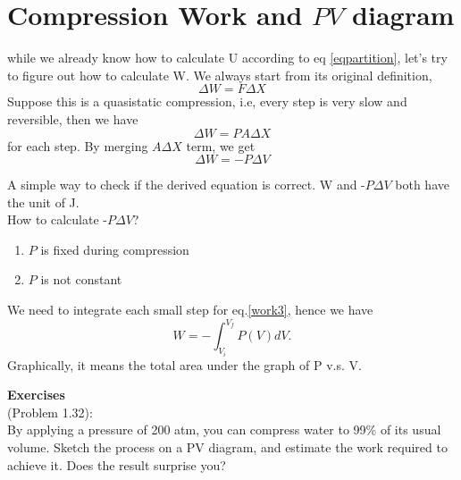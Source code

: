 \section{Compression Work and $PV$ diagram}
while we already know how to calculate U according to eq \ref{eqpartition}, let's try to figure out how to calculate W.
We always start from its original definition,
\begin{equation} \label{work1} \Delta W = F \Delta{X} \end{equation}
Suppose this is a quasistatic compression, i.e, every step is very slow and reversible, then we have
\begin{equation} \label{work2} \Delta W = P A \Delta{X} \end{equation}
for each step. By merging $A\Delta{X}$ term, we get
\begin{equation} \label{work3} \Delta W = - P \Delta{V} \end{equation}

A simple way to check if the derived equation is correct. W and -$P\Delta{V}$ both have the unit of J.\\
How to calculate -$P\Delta{V}$?
\begin{enumerate}
\item{$P$ is fixed during compression}
\item{$P$ is not constant}
\end{enumerate}
We need to integrate each small step for eq.\ref{work3}, hence we have
\begin{equation} \label{work4} W = -\int_{V_{i}}^{V_{f}} P(V)dV. \end{equation}
Graphically, it means the total area under the graph of P v.s. V. \\

{}


{\bf Exercises}\\
(Problem 1.32):\\
By applying a pressure of 200 atm, you can compress water to 99\% of its usual volume. Sketch the process on a PV diagram, and estimate the work required to achieve it. Does the result surprise you? \\\\\\\\\\\\\\


